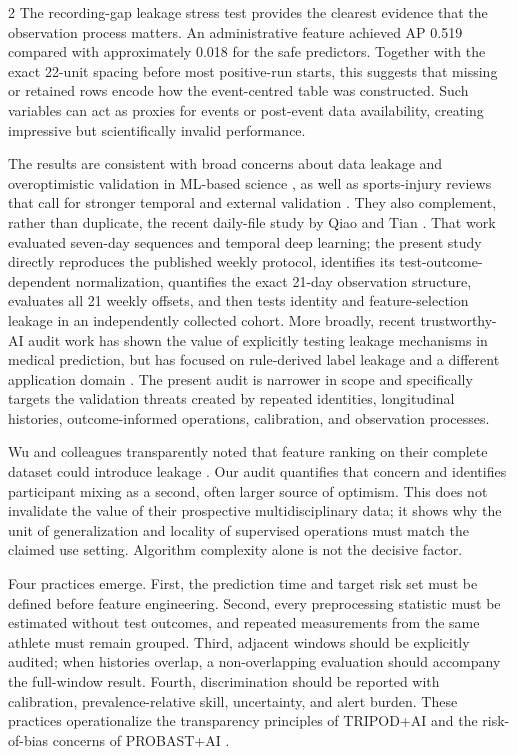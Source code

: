 \documentclass[11pt,a4paper]{article}
\begin{document}
\begin{multicols}{2}
The recording-gap leakage stress test provides the clearest evidence that the observation process matters. An administrative feature achieved AP 0.519 compared with approximately 0.018 for the safe predictors. Together with the exact 22-unit spacing before most positive-run starts, this suggests that missing or retained rows encode how the event-centred table was constructed. Such variables can act as proxies for events or post-event data availability, creating impressive but scientifically invalid performance.

The results are consistent with broad concerns about data leakage and overoptimistic validation in ML-based science \cite{kapoor2023}, as well as sports-injury reviews that call for stronger temporal and external validation \cite{vaneetvelde2021,leckey2025}. They also complement, rather than duplicate, the recent daily-file study by Qiao and Tian \cite{qiao2026}. That work evaluated seven-day sequences and temporal deep learning; the present study directly reproduces the published weekly protocol, identifies its test-outcome-dependent normalization, quantifies the exact 21-day observation structure, evaluates all 21 weekly offsets, and then tests identity and feature-selection leakage in an independently collected cohort. More broadly, recent trustworthy-AI audit work has shown the value of explicitly testing leakage mechanisms in medical prediction, but has focused on rule-derived label leakage and a different application domain \cite{benammar2026}. The present audit is narrower in scope and specifically targets the validation threats created by repeated identities, longitudinal histories, outcome-informed operations, calibration, and observation processes.

Wu and colleagues transparently noted that feature ranking on their complete dataset could introduce leakage \cite{wu2026}. Our audit quantifies that concern and identifies participant mixing as a second, often larger source of optimism. This does not invalidate the value of their prospective multidisciplinary data; it shows why the unit of generalization and locality of supervised operations must match the claimed use setting. Algorithm complexity alone is not the decisive factor.

Four practices emerge. First, the prediction time and target risk set must be defined before feature engineering. Second, every preprocessing statistic must be estimated without test outcomes, and repeated measurements from the same athlete must remain grouped. Third, adjacent windows should be explicitly audited; when histories overlap, a non-overlapping evaluation should accompany the full-window result. Fourth, discrimination should be reported with calibration, prevalence-relative skill, uncertainty, and alert burden. These practices operationalize the transparency principles of TRIPOD+AI and the risk-of-bias concerns of PROBAST+AI \cite{collins2024,moons2025}.


\end{multicols}
\end{document}
